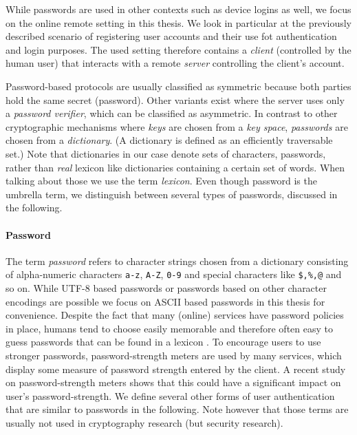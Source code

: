 While passwords are used in other contexts such as device logins as well, we focus on the online remote setting in this thesis.
We look in particular at the previously described scenario of registering user accounts and their use fot authentication and login purposes.
The used setting therefore contains a \emph{client} (controlled by the human user) that interacts with a remote \emph{server} controlling the client's account.

Password-based protocols are usually classified as symmetric because both parties hold the same secret (password).
Other variants exist where the server uses only a \emph{password verifier}, which can be classified as asymmetric.
In contrast to other cryptographic mechanisms where \emph{keys} are chosen from a \emph{key space}, \emph{passwords} are chosen from a \emph{dictionary}.
(A dictionary is defined as an efficiently traversable set.)
Note that dictionaries in our case denote sets of characters, \ie passwords, rather than \emph{real} lexicon like dictionaries containing a certain set of words.
When talking about those we use the term \emph{lexicon}.
Even though password is the umbrella term, we distinguish between several types of passwords, discussed in the following.

\paragraph{Password}
The term \emph{password} refers to character strings chosen from a dictionary consisting of alpha-numeric characters \texttt{a-z}, \texttt{A-Z}, \texttt{0-9} and special characters like \texttt{\$,\%,@} and so on.
While \acs{UTF-8} based passwords or passwords based on other character encodings are possible we focus on \acs{ASCII} based passwords in this thesis for convenience.
Despite the fact that many (online) services have password policies in place, humans tend to choose easily memorable and therefore often easy to guess passwords that can be found in a lexicon \cite{Florencio2007,Gaw2006}.
To encourage users to use stronger passwords, password-strength meters are used by many services, which display some measure of password strength entered by the client.
A recent study \cite{Ur2012} on password-strength meters shows that this could have a significant impact on user's password-strength.
We define several other forms of user authentication that are similar to passwords in the following.
Note however that those terms are usually not used in cryptography research (but security research).

